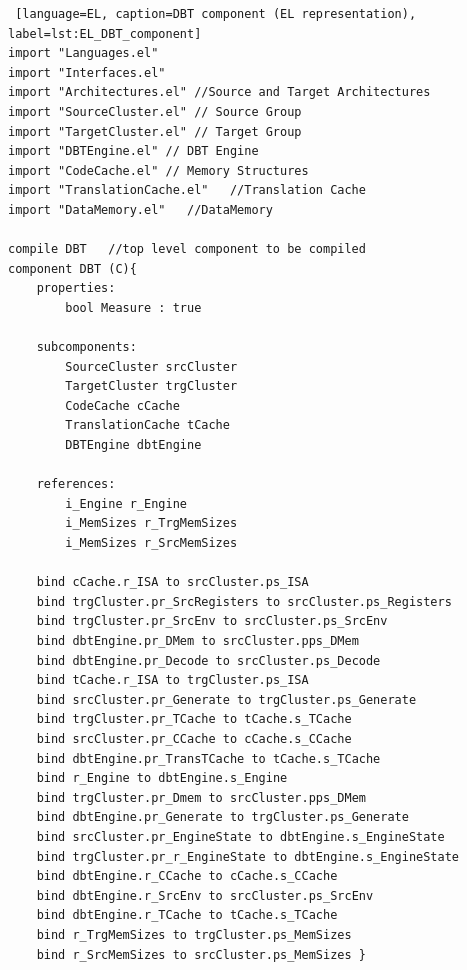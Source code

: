 \begin{lstlisting} [language=EL, caption=DBT component (EL representation), label=lst:EL_DBT_component]
import "Languages.el"
import "Interfaces.el"
import "Architectures.el" //Source and Target Architectures 
import "SourceCluster.el" // Source Group
import "TargetCluster.el" // Target Group 
import "DBTEngine.el" // DBT Engine
import "CodeCache.el" // Memory Structures 
import "TranslationCache.el"   //Translation Cache
import "DataMemory.el"   //DataMemory 

compile DBT   //top level component to be compiled
component DBT (C){
	properties:
		bool Measure : true
		
	subcomponents:
		SourceCluster srcCluster
		TargetCluster trgCluster
		CodeCache cCache
		TranslationCache tCache	
		DBTEngine dbtEngine
		
	references:
		i_Engine r_Engine
		i_MemSizes r_TrgMemSizes
		i_MemSizes r_SrcMemSizes
		
	bind cCache.r_ISA to srcCluster.ps_ISA
	bind trgCluster.pr_SrcRegisters to srcCluster.ps_Registers
	bind trgCluster.pr_SrcEnv to srcCluster.ps_SrcEnv
	bind dbtEngine.pr_DMem to srcCluster.pps_DMem
	bind dbtEngine.pr_Decode to srcCluster.ps_Decode
	bind tCache.r_ISA to trgCluster.ps_ISA
	bind srcCluster.pr_Generate to trgCluster.ps_Generate
	bind trgCluster.pr_TCache to tCache.s_TCache
	bind srcCluster.pr_CCache to cCache.s_CCache
	bind dbtEngine.pr_TransTCache to tCache.s_TCache
	bind r_Engine to dbtEngine.s_Engine
	bind trgCluster.pr_Dmem to srcCluster.pps_DMem				
	bind dbtEngine.pr_Generate to trgCluster.ps_Generate    	
	bind srcCluster.pr_EngineState to dbtEngine.s_EngineState 	
	bind trgCluster.pr_r_EngineState to dbtEngine.s_EngineState 
	bind dbtEngine.r_CCache to cCache.s_CCache					
	bind dbtEngine.r_SrcEnv to srcCluster.ps_SrcEnv			
	bind dbtEngine.r_TCache to tCache.s_TCache
	bind r_TrgMemSizes to trgCluster.ps_MemSizes
	bind r_SrcMemSizes to srcCluster.ps_MemSizes }
\end{lstlisting}


